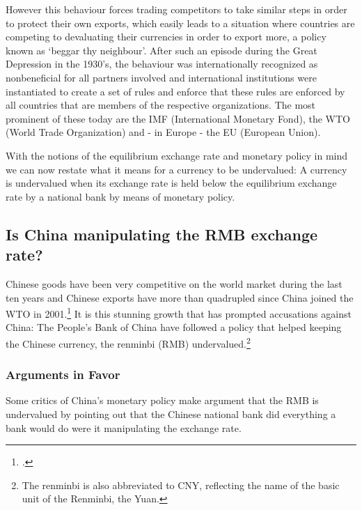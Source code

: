 However this behaviour forces trading competitors to take similar steps 
in order to protect their own exports, which easily leads to a situation 
where countries are competing to devaluating their currencies in order 
to export more, a policy known as ‘beggar thy neighbour’. After such an 
episode during the Great Depression in the 1930's, the behaviour was 
internationally recognized as nonbeneficial for all partners involved 
and international institutions were instantiated to create a set of 
rules and enforce that these rules are enforced by all countries that 
are members of the respective organizations. The most prominent of these 
today are the IMF (International Monetary Fond), the WTO (World Trade 
Organization) and - in Europe - the EU (European Union).

With the notions of the equilibrium exchange rate and monetary policy in 
mind we can now restate what it means for a currency to be undervalued: 
A currency is undervalued when its exchange rate is held below the 
equilibrium exchange rate by a national bank by means of monetary 
policy.

\subsection{Is China manipulating the RMB exchange rate?}

Chinese goods have been very competitive on the world market during the 
last ten years and Chinese exports have more than quadrupled since China 
joined the WTO in 2001.\footnote{\cite{FRED2012}.} It is this stunning 
growth that has prompted accusations against China: The People's Bank of 
China have followed a policy that helped keeping the Chinese currency, 
the renminbi (RMB) undervalued.\footnote{The renminbi is also 
abbreviated to CNY, reflecting the name of  the basic unit of the 
Renminbi, the Yuan.}

\subsubsection{Arguments in Favor}

Some critics of China's monetary policy make argument that the RMB is 
undervalued by pointing out that the Chinese national bank did 
everything a bank would do were it manipulating the exchange rate. 

